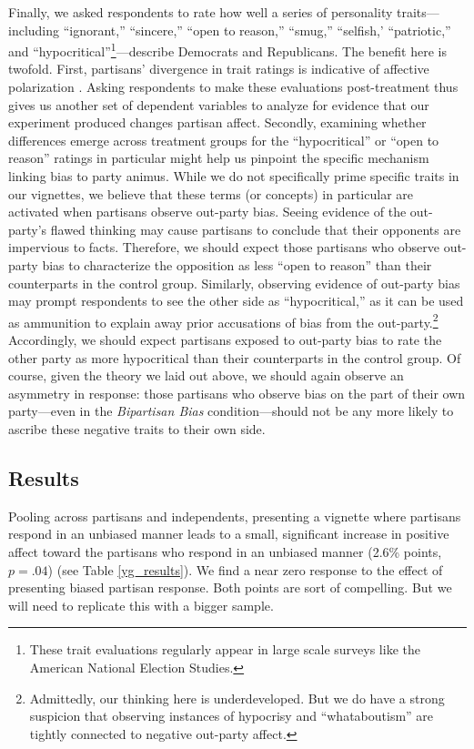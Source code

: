 \documentclass[12pt, letterpaper]{article}
\begin{document}
Finally, we asked respondents to rate how well a series of personality traits---including ``ignorant,'' ``sincere,'' ``open to reason,'' ``smug,'' ``selfish,' ``patriotic,'' and ``hypocritical''\footnote{These trait evaluations regularly appear in large scale surveys like the American National Election Studies.}---describe Democrats and Republicans. The benefit here is twofold. First, partisans' divergence in trait ratings is indicative of affective polarization \citep{hetheringtonlongrudolph_2016}. Asking respondents to make these evaluations post-treatment thus gives us another set of dependent variables to analyze for evidence that our experiment produced changes partisan affect. Secondly, examining whether differences emerge across treatment groups for the ``hypocritical'' or ``open to reason'' ratings in particular might help us pinpoint the specific mechanism linking bias to party animus. While we do not specifically prime specific traits in our vignettes, we believe that these terms (or concepts) in particular are activated when partisans observe out-party bias. Seeing evidence of the out-party's flawed thinking may cause partisans to conclude that their opponents are impervious to facts. Therefore, we should expect those partisans who observe out-party bias to characterize the opposition as less ``open to reason'' than their counterparts in the control group. Similarly, observing evidence of out-party bias may prompt respondents to see the other side as ``hypocritical,'' as it can be used as ammunition to explain away prior accusations of bias from the out-party.\footnote{Admittedly, our thinking here is underdeveloped. But we do have a strong suspicion that observing instances of hypocrisy and ``whataboutism'' are tightly connected to negative out-party affect.} Accordingly, we should expect partisans exposed to out-party bias to rate the other party as more hypocritical than their counterparts in the control group. Of course, given the theory we laid out above, we should again observe an asymmetry in response: those partisans who observe bias on the part of their own party---even in the \textit{Bipartisan Bias} condition---should not be any more likely to ascribe these negative traits to their own side. 

\subsection*{Results}

Pooling across partisans and independents, presenting a vignette where partisans respond in an unbiased manner leads to a small, significant increase in positive affect toward the partisans who respond in an unbiased manner (2.6\% points, $p = .04$) (see Table \ref{yg_results}). We find a near zero response to the effect of presenting biased partisan response. Both points are sort of compelling. But we will need to replicate this with a bigger sample. 
\end{document}
